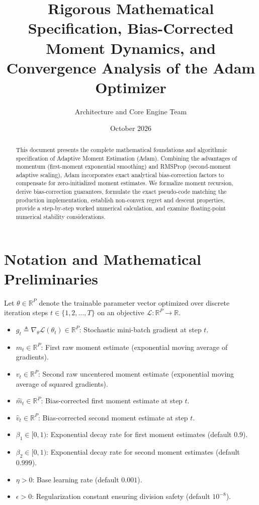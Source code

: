 \documentclass[11pt,a4paper]{article}
\title{\textbf{Rigorous Mathematical Specification, Bias-Corrected Moment Dynamics, and Convergence Analysis of the Adam Optimizer}}
\author{Architecture and Core Engine Team}
\date{October 2026}
\theoremstyle{definition}
\begin{document}
\maketitle

\begin{abstract}
This document presents the complete mathematical foundations and algorithmic specification of Adaptive Moment Estimation (Adam). Combining the advantages of momentum (first-moment exponential smoothing) and RMSProp (second-moment adaptive scaling), Adam incorporates exact analytical bias-correction factors to compensate for zero-initialized moment estimates. We formalize moment recursion, derive bias-correction guarantees, formulate the exact pseudo-code matching the production implementation, establish non-convex regret and descent properties, provide a step-by-step worked numerical calculation, and examine floating-point numerical stability considerations.
\end{abstract}

\section{Notation and Mathematical Preliminaries}

Let $\theta \in \mathbb{R}^P$ denote the trainable parameter vector optimized over discrete iteration steps $t \in \{1, 2, \dots, T\}$ on an objective $\mathcal{L}: \mathbb{R}^P \to \mathbb{R}$.

\begin{itemize}
    \item $g_t \triangleq \nabla_\theta \mathcal{L}(\theta_t) \in \mathbb{R}^P$: Stochastic mini-batch gradient at step $t$.
    \item $m_t \in \mathbb{R}^P$: First raw moment estimate (exponential moving average of gradients).
    \item $v_t \in \mathbb{R}^P$: Second raw uncentered moment estimate (exponential moving average of squared gradients).
    \item $\hat{m}_t \in \mathbb{R}^P$: Bias-corrected first moment estimate at step $t$.
    \item $\hat{v}_t \in \mathbb{R}^P$: Bias-corrected second moment estimate at step $t$.
    \item $\beta_1 \in [0, 1)$: Exponential decay rate for first moment estimates (default $0.9$).
    \item $\beta_2 \in [0, 1)$: Exponential decay rate for second moment estimates (default $0.999$).
    \item $\eta > 0$: Base learning rate (default $0.001$).
    \item $\epsilon > 0$: Regularization constant ensuring division safety (default $10^{-8}$).
\end{itemize}
\end{document}
